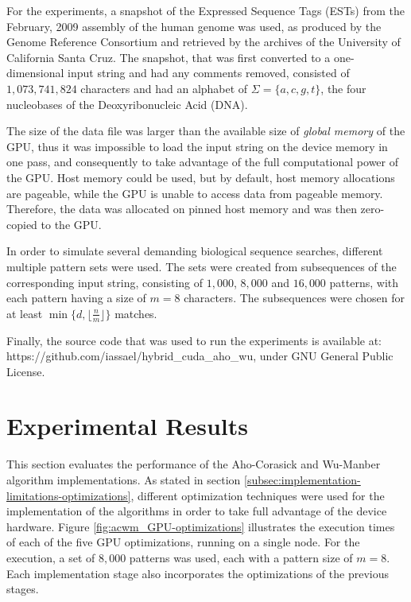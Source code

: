 \documentclass{ws-ijait}
\begin{document}
For the experiments, a snapshot of the Expressed Sequence Tags (ESTs) from the February, 2009 assembly of the human genome was used, as produced by the Genome Reference Consortium and retrieved by the archives of the University of California Santa Cruz.\cite{ucsc2013} The snapshot, that was first converted to a one-dimensional input string and had any comments removed, consisted of $1,073,741,824$ characters and had an alphabet of $\Sigma=\{a, c, g, t\}$, the four nucleobases of the Deoxyribonucleic Acid (DNA).

The size of the data file was larger than the available size of \textit{global memory} of the GPU, thus it was impossible to load the input string on the device memory in one pass, and consequently to take advantage of the full computational power of the GPU. Host memory could be used, but by default, host memory allocations are pageable, while the GPU is unable to access data from pageable memory. Therefore, the data was allocated on pinned host memory and was then zero-copied to the GPU.

In order to simulate several demanding biological sequence searches, different multiple pattern sets were used. The sets were created from subsequences of the corresponding input string, consisting of $1,000$, $8,000$ and $16,000$ patterns, with each pattern having a size of $m = 8$ characters. The subsequences were chosen for at least $\min\{d, \lfloor \frac{n}{m}\rfloor\}$ matches.

Finally, the source code that was used to run the experiments is available at: https://github.com/iassael/hybrid\_cuda\_aho\_wu, under GNU General Public License.

\section{Experimental Results}
\label{sec:experimental-results}

This section evaluates the performance of the Aho-Corasick and Wu-Manber algorithm implementations. As stated in section \ref{subsec:implementation-limitations-optimizations}, different optimization techniques were used for the implementation of the algorithms in order to take full advantage of the device hardware. Figure \ref{fig:acwm_GPU-optimizations} illustrates the execution times of each of the five GPU optimizations, running on a single node. For the execution, a set of $8,000$ patterns was used, each with a pattern size of $m=8$. Each implementation stage also incorporates the optimizations of the previous stages.
\end{document}
